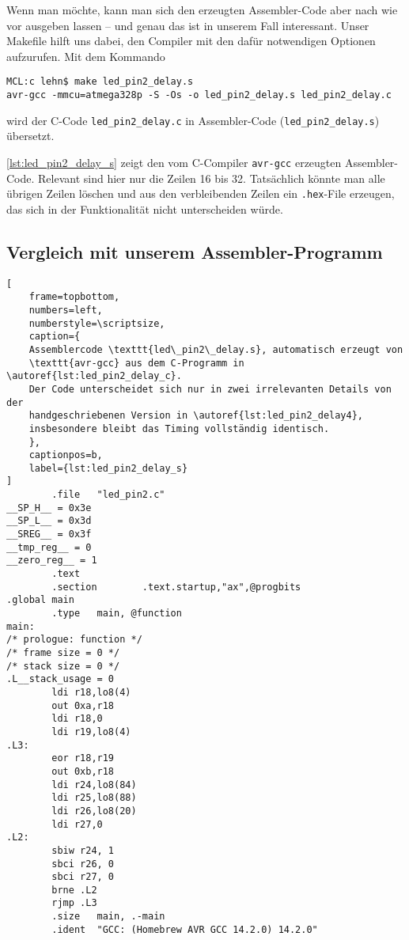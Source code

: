 \documentclass[a4paper,12pt]{article}
\begin{document}
Wenn man möchte, kann man sich den erzeugten Assembler-Code aber nach wie vor
ausgeben lassen – und genau das ist in unserem Fall interessant. Unser Makefile
hilft uns dabei, den Compiler mit den dafür notwendigen Optionen aufzurufen.
Mit dem Kommando

\begin{lstlisting}
MCL:c lehn$ make led_pin2_delay.s
avr-gcc -mmcu=atmega328p -S -Os -o led_pin2_delay.s led_pin2_delay.c
\end{lstlisting}

\noindent
wird der C-Code \texttt{led\_pin2\_delay.c} in Assembler-Code
(\texttt{led\_pin2\_delay.s}) übersetzt.

\autoref{lst:led_pin2_delay_s} zeigt den vom C-Compiler \texttt{avr-gcc}
erzeugten Assembler-Code. Relevant sind hier nur die Zeilen 16 bis 32.
Tatsächlich könnte man alle übrigen Zeilen löschen und aus den verbleibenden
Zeilen ein \texttt{.hex}-File erzeugen, das sich in der Funktionalität nicht
unterscheiden würde.

\newpage
\subsection{Vergleich mit unserem Assembler-Programm}

\begin{listing}[htbp]
\begin{lstlisting}[
    frame=topbottom,
    numbers=left,
    numberstyle=\scriptsize,
    caption={
	Assemblercode \texttt{led\_pin2\_delay.s}, automatisch erzeugt von
	\texttt{avr-gcc} aus dem C-Programm in \autoref{lst:led_pin2_delay_c}.  
	Der Code unterscheidet sich nur in zwei irrelevanten Details von der
	handgeschriebenen Version in \autoref{lst:led_pin2_delay4},
	insbesondere bleibt das Timing vollständig identisch.
    },
    captionpos=b,
    label={lst:led_pin2_delay_s}
]
        .file   "led_pin2.c"
__SP_H__ = 0x3e
__SP_L__ = 0x3d
__SREG__ = 0x3f
__tmp_reg__ = 0
__zero_reg__ = 1
        .text
        .section        .text.startup,"ax",@progbits
.global main
        .type   main, @function
main:
/* prologue: function */
/* frame size = 0 */
/* stack size = 0 */
.L__stack_usage = 0
        ldi r18,lo8(4)
        out 0xa,r18
        ldi r18,0
        ldi r19,lo8(4)
.L3:
        eor r18,r19
        out 0xb,r18
        ldi r24,lo8(84)
        ldi r25,lo8(88)
        ldi r26,lo8(20)
        ldi r27,0
.L2:
        sbiw r24, 1
        sbci r26, 0
        sbci r27, 0
        brne .L2
        rjmp .L3
        .size   main, .-main
        .ident  "GCC: (Homebrew AVR GCC 14.2.0) 14.2.0"
\end{lstlisting}
\end{listing}
\end{document}
